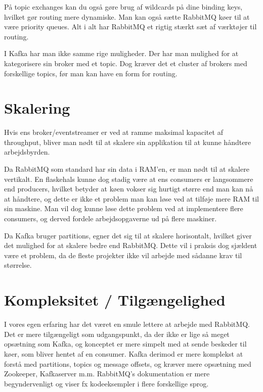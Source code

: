\documentclass[
]{article}
\begin{document}
På topic exchanges kan du også gøre brug af wildcards på dine binding
keys, hvilket gør routing mere dynamiske. Man kan også sætte RabbitMQ
køer til at være priority queues.\cite{rabbit-priority-queue} Alt i alt har RabbitMQ et
rigtig stærkt sæt af værktøjer til routing.

I Kafka har man ikke samme rige muligheder. Der har man mulighed for at
kategorisere sin broker med et topic. Dog kræver det et cluster af
brokers med forskellige topics, før man kan have en form for routing.\cite{kafka-routing}

\hypertarget{skalering}{%
\section{Skalering}\label{skalering}}

Hvis ens broker/eventstreamer er ved at ramme maksimal kapacitet af
throughput, bliver man nødt til at skalere sin applikation til at kunne
håndtere arbejdsbyrden.

Da RabbitMQ som standard har sin data i RAM'en, er man nødt til at
skalere vertikalt. En flaskehals kunne dog stadig være at ens consumers
er langsommere end producers, hvilket betyder at køen vokser sig hurtigt
større end man kan nå at håndtere, og dette er ikke et problem man kan
løse ved at tilføje mere RAM til sin maskine. Man vil dog kunne løse
dette problem ved at implementere flere consumers, og derved fordele
arbejdsopgaverne ud på flere maskiner.

Da Kafka bruger partitions, egner det sig til at skalere horisontalt,
hvilket giver det mulighed for at skalere bedre end RabbitMQ.\cite{kafka-scaling} Dette vil
i praksis dog sjældent være et problem, da de fleste projekter ikke vil
arbejde med sådanne krav til størrelse.

\hypertarget{kompleksitet-tilguxe6ngelighed}{%
\section{Kompleksitet /
Tilgængelighed}\label{kompleksitet-tilguxe6ngelighed}}

I vores egen erfaring har det været en smule lettere at arbejde med
RabbitMQ. Det er mere tilgængeligt som udgangspunkt, da der ikke er lige
så meget opsætning som Kafka, og konceptet er mere simpelt med at sende
beskeder til køer, som bliver hentet af en consumer. Kafka derimod er
mere komplekst at forstå med partitions, topics og message offsets, og
kræver mere opsætning med Zookeeper, Kafkaserver m.m. RabbitMQ's
dokumentation er mere begyndervenligt og viser fx kodeeksempler i flere
forskellige sprog.\cite{rabbit-guide}\cite{kafka-guide}
\end{document}
